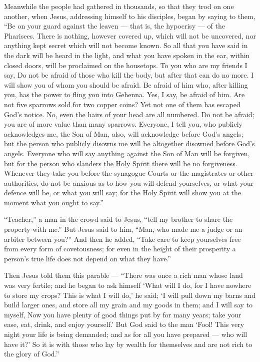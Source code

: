  Meanwhile the people had gathered in thousands, so that
they trod on one another, when Jesus, addressing himself to his
disciples, began by saying to them, ``Be on your guard against the
leaven --- that is, the hypocrisy --- of the Pharisees. 
There is nothing, however covered up, which will not be uncovered, nor
anything kept secret which will not become known.  So all
that you have said in the dark will be heard in the light, and what you
have spoken in the ear, within closed doors, will be proclaimed on the
housetops.  To you who are my friends I say, Do not be
afraid of those who kill the body, but after that can do no more.
 I will show you of whom you should be afraid. Be afraid of
him who, after killing you, has the power to fling you into Gehenna.
Yes, I say, be afraid of him.  Are not five sparrows sold
for two copper coins? Yet not one of them has escaped God's notice.
 No, even the hairs of your head are all numbered. Do not be
afraid; you are of more value than many sparrows.  Everyone,
I tell you, who publicly acknowledges me, the Son of Man, also, will
acknowledge before God's angels;  but the person who
publicly disowns me will be altogether disowned before God's angels.
 Everyone who will say anything against the Son of Man will
be forgiven, but for the person who slanders the Holy Spirit there will
be no forgiveness.  Whenever they take you before the
synagogue Courts or the magistrates or other authorities, do not be
anxious as to how you will defend yourselves, or what your defence will
be, or what you will say;  for the Holy Spirit will show
you at the moment what you ought to say.''

 ``Teacher,'' a man in the crowd said to Jesus, ``tell my
brother to share the property with me.''  But Jesus said to
him, ``Man, who made me a judge or an arbiter between you?''
 And then he added, ``Take care to keep yourselves free
from every form of covetousness; for even in the height of their
prosperity a person's true life does not depend on what they have.''

 Then Jesus told them this parable --- ``There was once a
rich man whose land was very fertile;  and he began to ask
himself `What will I do, for I have nowhere to store my crops?
 This is what I will do,' he said; `I will pull down my
barns and build larger ones, and store all my grain and my goods in
them;  and I will say to myself, Now you have plenty of
good things put by for many years; take your ease, eat, drink, and enjoy
yourself.'  But God said to the man `Fool! This very night
your life is being demanded; and as for all you have prepared --- who
will have it?'  So it is with those who lay by wealth for
themselves and are not rich to the glory of God.''

